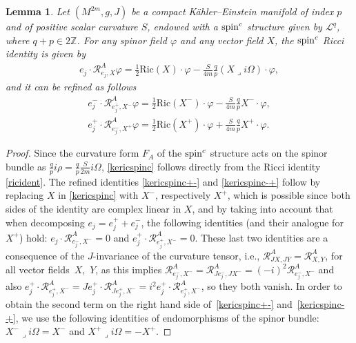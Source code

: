 \documentclass[pdftex]{sigma}
\numberwithin{equation}{section}
\newtheorem{lem}[thm]{Lemma}
\theoremstyle{definition}
\begin{document}
\begin{lem} \label{lemmacit}
Let $(M^{2m},g,J)$ be a compact K\"ahler--Einstein manifold of index $p$ and of positive scalar curvature $S$, endowed with a ${\mathop{\rm spin}^c}$ structure given by $\mathcal{L}^q$, where  $q+p\in2\mathbb{Z}$. For any spinor field $\varphi$ and any vector field $X$, the ${\mathop{\rm spin}^c}$ Ricci identity is given by
\begin{gather} \label{kericspinc}
e_j \cdot\mathcal{R}^A_{e_j,X} \varphi = \frac{1}{2}\mathrm{Ric}(X) \cdot\varphi- \frac{S}{4m}\frac{q}{p} (X\lrcorner i\Omega)\cdot\varphi,
\end{gather}
and it can be refined as follows
\begin{gather}\label{kericspinc+-}
e^-_j \cdot\mathcal{R}^A_{e^+_j,X^-} \varphi =\frac{1}{2}\mathrm{Ric}(X^-)\cdot \varphi -\frac{S}{4m}\frac{q}{p} X^-\cdot\varphi,
\\
\label{kericspinc-+}
e^+_j \cdot\mathcal{R}^A_{e^-_j,X^+} \varphi  = \frac{1}{2}\mathrm{Ric}(X^+)\cdot \varphi +\frac{S}{4m}\frac{q}{p} X^+\cdot\varphi.
\end{gather}
\end{lem}

\begin{proof} Since the  curvature form $F_A$ of the ${\mathop{\rm spin}^c}$ structure acts on the spinor bundle as $\frac{q}{p}i\rho=\frac{q}{p} \frac{S}{2m} i\Omega$, \eqref{kericspinc} follows directly from the Ricci identity \eqref{ricident}. The ref\/ined identities \eqref{kericspinc+-} and \eqref{kericspinc-+}  follow by replacing $X$ in \eqref{kericspinc} with $X^-$, respectively $X^+$, which is possible since both sides of the identity are complex linear in $X$, and by taking into account that when decomposing $e_j=e_j^+ + e^-_j$, the following identities (and their analogue for $X^+$) hold: $e_j \cdot\mathcal{R}^A_{e^-_j,X^-}=0$ and $e^+_j \cdot\mathcal{R}^A_{e^+_j,X^-}=0$. These last two identities are a consequence of the $J$-invariance of the curvature tensor,  i.e.,  $\mathcal{R}^A_{JX,JY}=\mathcal{R}^A_{X,Y}$,
for all vector f\/ields~$X$,~$Y$, as this implies $\mathcal{R}^A_{e^-_j,X^-}=\mathcal{R}^A_{Je^-_j,JX^-}=(-i)^2\mathcal{R}^A_{e^-_j,X^-}$ and also $e^+_j \cdot\mathcal{R}^A_{e^+_j,X^-}=Je^+_j \cdot\mathcal{R}^A_{Je^+_j,X^-}=i^2 e^+_j \cdot\mathcal{R}^A_{e^+_j,X^-}$, so they both vanish. In order to obtain the second term on the right hand side of~\eqref{kericspinc+-} and~\eqref{kericspinc-+}, we use the following identities
 of endomorphisms of the spinor bundle: $X^-\lrcorner i\Omega=X^-$ and $X^+\lrcorner i\Omega=-X^+$.
\end{proof}
\end{document}
